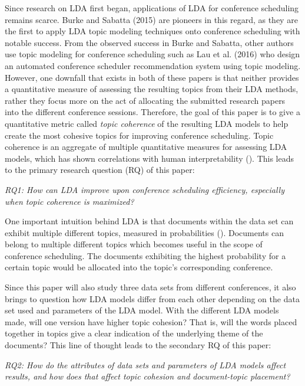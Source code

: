 \documentclass[a4paper, 12pt, twoside]{article}
\numberwithin{equation}{section} %
\begin{document}
Since research on LDA first began, applications of LDA for conference scheduling remains scarce. Burke and Sabatta (2015) are pioneers in this regard, as they are the first to apply LDA topic modeling techniques onto conference scheduling with notable success. From the observed success in Burke and Sabatta, other authors use topic modeling for conference scheduling such as Lau et al. (2016) \nocite{lau2016}who design an automated conference scheduler recommendation system using topic modeling. However, one downfall that exists in both of these papers is that neither provides a quantitative measure of assessing the resulting topics from their LDA methods, rather they focus more on the act of allocating the submitted research papers into the different conference sessions. Therefore, the goal of this paper is to give a quantitative metric called \textit{topic coherence} of the resulting LDA models to help create the most cohesive topics for improving conference scheduling. Topic coherence is an aggregate of multiple quantitative measures for assessing LDA models, which has shown correlations with human interpretability (\cite{roder2015}). This leads to the primary research question (RQ) of this paper:

\begin{center}
\textit{RQ1: How can LDA improve upon conference scheduling efficiency, especially when topic coherence is maximized?}
\end{center}

One important intuition behind LDA is that documents within the data set can exhibit multiple different topics, measured in probabilities (\cite{blei2012}). Documents can belong to multiple different topics which becomes useful in the scope of conference scheduling. The documents exhibiting the highest probability for a certain topic would be allocated into the topic's corresponding conference. 

Since this paper will also study three data sets from different conferences, it also brings to question how LDA models differ from each other depending on the data set used and parameters of the LDA model. With the different LDA models made, will one version have higher topic cohesion? That is, will the words placed together in topics give a clear indication of the underlying theme of the documents? This line of thought leads to the secondary RQ of this paper:

\begin{center}
\textit{RQ2: How do the attributes of data sets and parameters of LDA models affect results, and how does that affect topic cohesion and document-topic placement?}
\end{center}
\end{document}
